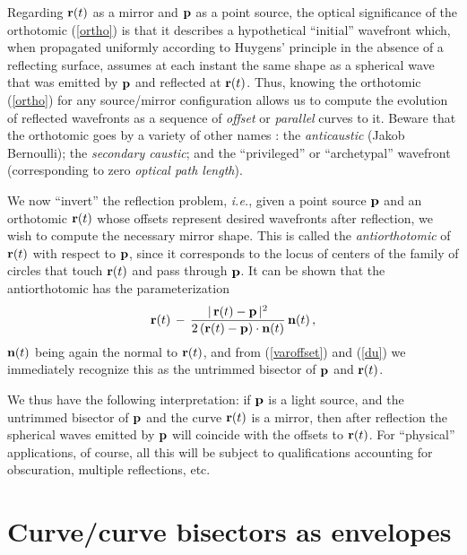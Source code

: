 Regarding ${\bf r}(t)$ as a mirror and ${\bf p}$ as a point
source, the optical significance of the orthotomic (\ref{ortho})
is that it describes a hypothetical ``initial'' wavefront which,
when propagated uniformly according to Huygens' principle in
the absence of a reflecting surface, assumes at each instant the
same shape as a spherical wave that was emitted by ${\bf p}$
and reflected at ${\bf r}(t)$. Thus, knowing the orthotomic
(\ref{ortho}) for any source/mirror configuration allows us to
compute the evolution of reflected wavefronts as a sequence of
{\it offset\/} or {\it parallel\/} curves to it. Beware that the
orthotomic goes by a variety of other names \cite{farouki92b}:
the {\it anticaustic\/} (Jakob Bernoulli); the {\it secondary
caustic\/}; and the ``privileged'' or ``archetypal'' wavefront
(corresponding to zero {\it optical path length\/}).

We now ``invert'' the reflection problem, {\it i.e.}, given
a point source ${\bf p}$ and an orthotomic ${\bf r}(t)$ whose
offsets represent desired wavefronts after reflection, we wish
to compute the necessary mirror shape. This is called the {\it
antiorthotomic\/} of ${\bf r}(t)$ with respect to ${\bf p}$,
since it corresponds to the locus of centers of the family of
circles that touch ${\bf r}(t)$ and pass through ${\bf p}$.
It can be shown \cite{bruce84} that the antiorthotomic has
the parameterization
\begin{equation} \label{antiortho}
{\bf r}(t) \,-\,
{|\,{\bf r}(t)-{\bf p}\,|^2 \over
2\,({\bf r}(t)-{\bf p})\cdot{\bf n}(t)} \, {\bf n}(t) \,,
\end{equation}
${\bf n}(t)$ being again the normal to ${\bf r}(t)$, and from
(\ref{varoffset}) and (\ref{du}) we immediately recognize this
as the untrimmed bisector of ${\bf p}$ and ${\bf r}(t)$.

We thus have the following interpretation: if ${\bf p}$ is
a light source, and the untrimmed bisector of ${\bf p}$ and
the curve ${\bf r}(t)$ is a mirror, then after reflection the
spherical waves emitted by ${\bf p}$ will coincide with the
offsets to ${\bf r}(t)$. For ``physical'' applications, of
course, all this will be subject to qualifications accounting
for obscuration, multiple reflections, etc.

\section{Curve/curve bisectors as envelopes}
\label{sec:env}

